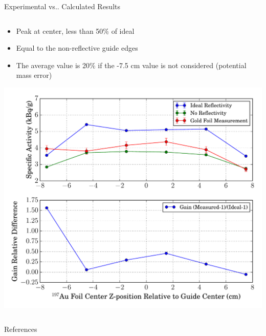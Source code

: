 \documentclass[final,t]{beamer}
\makeatletter
\DeclareRobustCommand\onedot{\futurelet\@let@token\@onedot}
\def\@onedot{\ifx\@let@token.\else.\null\fi\xspace}
\def\vs{{vs}\onedot}
\makeatother
\begin{document}
\begin{frame}{}
\begin{columns}[t]
\begin{column}{.3\linewidth}
\begin{block}{Experimental \vs Calculated Results}
\begin{columns}
      \begin{column}{0.5\linewidth}

      \begin{itemize}
      \item Peak at center, less than 50\% of ideal
      \item Equal to the non-reflective guide edges
      \item The average value is 20\% if the -7.5 cm value is not considered (potential mass error)
      \end{itemize}

      \begin{center}
      \includegraphics*[width=\linewidth]{GF_act.pdf}
      \end{center}
      
      \end{column}

      \end{columns}

      \end{block}



    \end{column}
  \end{columns}

      \begin{block}{References}


\end{block}
\end{frame}
\end{document}
